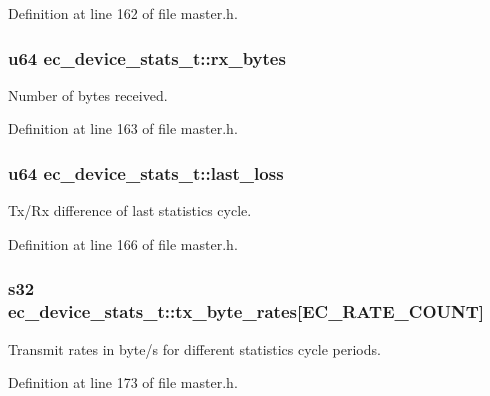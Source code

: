 \-Definition at line 162 of file master.\-h.

\subsubsection[{rx\-\_\-bytes}]{\setlength{\rightskip}{0pt plus 5cm}u64 {\bf ec\-\_\-device\-\_\-stats\-\_\-t\-::rx\-\_\-bytes}}\label{structec__device__stats__t_a7aa4d7f1b8804dfd50d0b6caef15de9f}


\-Number of bytes received. 



\-Definition at line 163 of file master.\-h.

\subsubsection[{last\-\_\-loss}]{\setlength{\rightskip}{0pt plus 5cm}u64 {\bf ec\-\_\-device\-\_\-stats\-\_\-t\-::last\-\_\-loss}}\label{structec__device__stats__t_a9cb31cea1af324f2a46ece82690027c7}


\-Tx/\-Rx difference of last statistics cycle. 



\-Definition at line 166 of file master.\-h.

\subsubsection[{tx\-\_\-byte\-\_\-rates}]{\setlength{\rightskip}{0pt plus 5cm}s32 {\bf ec\-\_\-device\-\_\-stats\-\_\-t\-::tx\-\_\-byte\-\_\-rates}[{\bf \-E\-C\-\_\-\-R\-A\-T\-E\-\_\-\-C\-O\-U\-N\-T}]}\label{structec__device__stats__t_ac12aa6100b6c79d8c25f38d6c163bd3e}


\-Transmit rates in byte/s for different statistics cycle periods. 



\-Definition at line 173 of file master.\-h.

